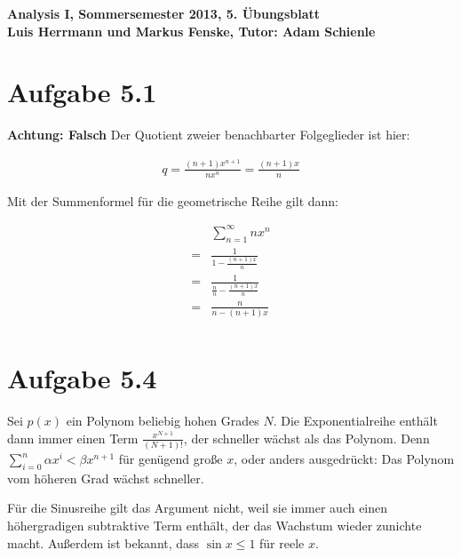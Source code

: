 \documentclass[a4paper,german,12pt,smallheadings]{scrartcl}
\begin{document}
\begin{center}
\bfseries %
\sffamily %
\vspace{-40pt}
Analysis I, Sommersemester 2013, 5. Übungsblatt \\
Luis Herrmann und Markus Fenske, Tutor: Adam Schienle
\vspace{-10pt}
\end{center}

\section{Aufgabe 5.1}
\textbf{Achtung: Falsch}
Der Quotient zweier benachbarter Folgeglieder ist hier:

\begin{align*}
  q = \frac{(n+1)x^{n+1}}{nx^n} = \frac{(n+1)x}{n}
\end{align*}

Mit der Summenformel für die geometrische Reihe gilt dann:

\begin{align*}
   &\sum_{n=1}^\infty n x^n \\
  =&\frac{1}{1 - \frac{(n+1)x}{n}} \\
  =&\frac{1}{\frac{n}{n} - \frac{(n+1)x}{n}} \\
  =&\frac{n}{n - (n+1)x} \\
\end{align*}
\section{Aufgabe 5.4}

Sei $p(x)$ ein Polynom beliebig hohen Grades $N$. Die Exponentialreihe enthält
dann immer einen Term $\frac{x^{N+1}}{(N+1)!}$, der schneller wächst als das
Polynom. Denn $\sum_{i=0}^n \alpha x^i < \beta x^{n+1}$ für genügend große $x$,
oder anders ausgedrückt: Das Polynom vom höheren Grad wächst schneller.

Für die Sinusreihe gilt das Argument nicht, weil sie immer auch einen
höhergradigen subtraktive Term enthält, der das Wachstum wieder zunichte macht.
Außerdem ist bekannt, dass $\sin x \le 1$ für reele $x$.
\end{document}
